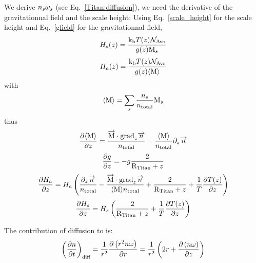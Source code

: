 We derive $n_s\omega_s$ (see Eq.~\ref{Titan:diffusion}),
we need the derivative of the gravitationnal field and the scale height:
Using Eq.~\ref{scale_height} for the scale height and Eq.~\ref{gfield}
for the gravitationnal field,
\begin{equation}
H_s(z) = \frac{\text{k}_\text{b} T(z) \mathcal{N}_\text{Avo}}{g(z)\text{M}_s}
\label{Titan:scale_height_spec}
\end{equation}
\begin{equation}
H_a(z) = \frac{\text{k}_\text{b} T(z) \mathcal{N}_\text{Avo}}{g(z)\langle\text{M}\rangle}
\label{Titan:scale_height_atm}
\end{equation}
with
\begin{equation}
\langle\text{M}\rangle = \sum_s \frac{n_s}{n_\text{total}} \text{M}_s
\end{equation}
thus
\begin{equation}
\frac{\partial\langle\text{M}\rangle}{\partial z} =   \frac{\overrightarrow{\text{M}}\cdot\text{grad}_{z}\overrightarrow{n}}{n_\text{total}}
                        - \frac{\langle\text{M}\rangle}{n_\text{total}}\partial_{z}{\overrightarrow{n}}
\end{equation}
\begin{equation}
\frac{\partial g}{\partial z} = -   g \frac{2}{\text{R}_\text{Titan} + z}
\end{equation}
\begin{equation}
\frac{\partial H_a}{\partial z} = H_a \left(\frac{\partial_{z}{\overrightarrow{n}}}{n_\text{total}}
                                - \frac{\overrightarrow{\text{M}}\cdot\text{grad}_{z}\overrightarrow{n}}{\langle\text{M}\rangle n_\text{total}}
                                + \frac{2}{\text{R}_\text{Titan} + z} 
                                + \frac{1}{T}\frac{\partial T(z)}{\partial z}\right)
\end{equation}
\begin{equation}
\frac{\partial H_s}{\partial z} = H_s\left(\frac{2}{\text{R}_\text{Titan} + z} + \frac{1}{T}\frac{\partial T(z)}{\partial z}\right) 
\end{equation}

The contribution of diffusion to  is:
\begin{equation}
\left(\frac{\partial n}{\partial t}\right)_{\text{diff}} = \frac{1}{r^2}\frac{\partial\left(r^2n\omega\right)}{\partial r}
                                             = \frac{1}{r^2}\left(2 r + \frac{\partial\left(n\omega\right)}{\partial z}\right)
\label{Titan:diffusion}
\end{equation}

